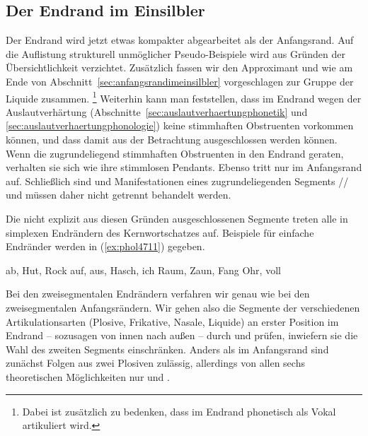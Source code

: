 
\subsection{Der Endrand im Einsilbler}

\label{sec:endrandimeinsilbler}

Der Endrand wird jetzt etwas kompakter abgearbeitet als der Anfangsrand.
Auf die Auflistung strukturell unmöglicher Pseudo-Beispiele wird aus Gründen der Übersichtlichkeit verzichtet.
Zusätzlich fassen wir den Approximant und \textipa{[K]} wie am Ende von Abschnitt~\ref{sec:anfangsrandimeinsilbler} vorgeschlagen zur Gruppe der Liquide zusammen.%
\footnote{Dabei ist zusätzlich zu bedenken, dass \textipa{[K]} im Endrand phonetisch als Vokal artikuliert wird.}
Weiterhin kann man feststellen, dass im Endrand wegen der Auslautverhärtung (Abschnitte~\ref{sec:auslautverhaertungphonetik} und \ref{sec:auslautverhaertungphonologie}) keine stimmhaften Obstruenten vorkommen können, und dass damit \textipa{[b d g v z J]} aus der Betrachtung ausgeschlossen werden können.
Wenn die zugrundeliegend stimmhaften Obstruenten in den Endrand geraten, verhalten sie sich wie ihre stimmlosen Pendants. 
Ebenso tritt \textipa{[h]} nur im Anfangsrand auf.
Schließlich sind \textipa{[\c{c}]} und \textipa{[X]} Manifestationen eines zugrundeliegenden Segments // und müssen daher nicht getrennt behandelt werden.

Die nicht explizit aus diesen Gründen ausgeschlossenen Segmente treten alle in simplexen Endrändern des Kernwortschatzes auf.
Beispiele für einfache Endränder werden in (\ref{ex:phol4711}) gegeben.

\begin{exe}
  \ex\label{ex:phol4711}
  \begin{xlist}
  	\ex ab, Hut, Rock
  	\ex auf, aus, Hasch, ich
  	\ex Raum, Zaun, Fang
  	\ex Ohr, voll
  \end{xlist}
\end{exe}

Bei den zweisegmentalen Endrändern verfahren wir genau wie bei den zweisegmentalen Anfangsrändern.
Wir gehen also die Segmente der verschiedenen Artikulationsarten (Plosive, Frikative, Nasale, Liquide) an erster Position im Endrand -- sozusagen von innen nach außen -- durch und prüfen, inwiefern sie die Wahl des zweiten Segments einschränken.
Anders als im Anfangsrand sind zunächst Folgen aus zwei Plosiven zulässig, allerdings von allen sechs theoretischen Möglichkeiten nur \textipa{[pt]} und \textipa{[kt]}.

